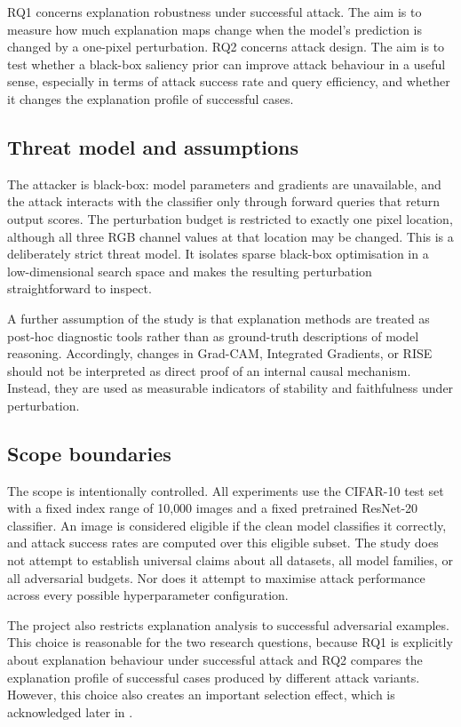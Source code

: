 RQ1 concerns explanation robustness under successful attack.
The aim is to measure how much explanation maps change when the model's prediction is changed by a one-pixel perturbation.
RQ2 concerns attack design.
The aim is to test whether a black-box saliency prior can improve attack behaviour in a useful sense, especially in terms of attack success rate and query efficiency, and whether it changes the explanation profile of successful cases.

\subsection{Threat model and assumptions}
The attacker is black-box: model parameters and gradients are unavailable, and the attack interacts with the classifier only through forward queries that return output scores.
The perturbation budget is restricted to exactly one pixel location, although all three RGB channel values at that location may be changed.
This is a deliberately strict threat model.
It isolates sparse black-box optimisation in a low-dimensional search space and makes the resulting perturbation straightforward to inspect.

A further assumption of the study is that explanation methods are treated as post-hoc diagnostic tools rather than as ground-truth descriptions of model reasoning.
Accordingly, changes in Grad-CAM, Integrated Gradients, or RISE should not be interpreted as direct proof of an internal causal mechanism.
Instead, they are used as measurable indicators of stability and faithfulness under perturbation.

\subsection{Scope boundaries}
The scope is intentionally controlled.
All experiments use the CIFAR-10 test set with a fixed index range of 10{,}000 images and a fixed pretrained ResNet-20 classifier.
An image is considered eligible if the clean model classifies it correctly, and attack success rates are computed over this eligible subset.
The study does not attempt to establish universal claims about all datasets, all model families, or all adversarial budgets.
Nor does it attempt to maximise attack performance across every possible hyperparameter configuration.

The project also restricts explanation analysis to successful adversarial examples.
This choice is reasonable for the two research questions, because RQ1 is explicitly about explanation behaviour under successful attack and RQ2 compares the explanation profile of successful cases produced by different attack variants.
However, this choice also creates an important selection effect, which is acknowledged later in .

